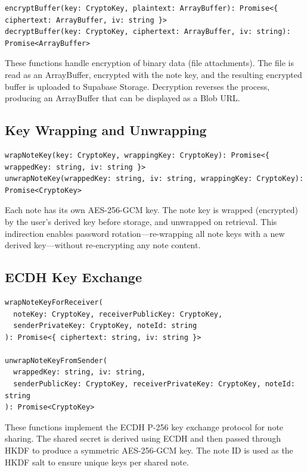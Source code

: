 \begin{verbatim}
encryptBuffer(key: CryptoKey, plaintext: ArrayBuffer): Promise<{ ciphertext: ArrayBuffer, iv: string }>
decryptBuffer(key: CryptoKey, ciphertext: ArrayBuffer, iv: string): Promise<ArrayBuffer>
\end{verbatim}

These functions handle encryption of binary data (file attachments). The file is read as an ArrayBuffer, encrypted with the note key, and the resulting encrypted buffer is uploaded to Supabase Storage. Decryption reverses the process, producing an ArrayBuffer that can be displayed as a Blob URL.

\subsection{Key Wrapping and Unwrapping}

\begin{verbatim}
wrapNoteKey(key: CryptoKey, wrappingKey: CryptoKey): Promise<{ wrappedKey: string, iv: string }>
unwrapNoteKey(wrappedKey: string, iv: string, wrappingKey: CryptoKey): Promise<CryptoKey>
\end{verbatim}

Each note has its own AES-256-GCM key. The note key is wrapped (encrypted) by the user's derived key before storage, and unwrapped on retrieval. This indirection enables password rotation---re-wrapping all note keys with a new derived key---without re-encrypting any note content.

\subsection{ECDH Key Exchange}

\begin{verbatim}
wrapNoteKeyForReceiver(
  noteKey: CryptoKey, receiverPublicKey: CryptoKey,
  senderPrivateKey: CryptoKey, noteId: string
): Promise<{ ciphertext: string, iv: string }>

unwrapNoteKeyFromSender(
  wrappedKey: string, iv: string,
  senderPublicKey: CryptoKey, receiverPrivateKey: CryptoKey, noteId: string
): Promise<CryptoKey>
\end{verbatim}

These functions implement the ECDH P-256 key exchange protocol for note sharing. The shared secret is derived using ECDH and then passed through HKDF to produce a symmetric AES-256-GCM key. The note ID is used as the HKDF salt to ensure unique keys per shared note.

